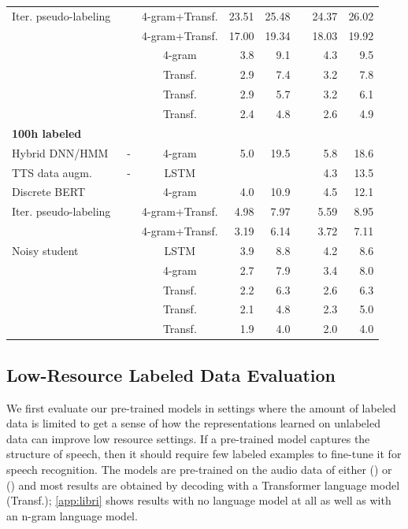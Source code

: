 \documentclass{article}
\begin{document}
\begin{table}[t]
\begin{tabular}{lccrrrrr}
Iter. pseudo-labeling~\cite{xu2020iterative} & \librisz{} & 4-gram+Transf. & 23.51 & 25.48 && 24.37 & 26.02 \\
{} & \voxsz{} & 4-gram+Transf. & 17.00 & 19.34 && 18.03 & 19.92 \\
\midrule
\wvppbase{} & \librisz{} & 4-gram & 3.8 & 9.1 && 4.3 & 9.5 \\
&& Transf. & 2.9 & 7.4 && 3.2 & 7.8 \\
\wvppbig{} & \librisz{} & Transf. & 2.9 & 5.7 && 3.2 & 6.1 \\
& \voxsz{} & Transf. & 2.4 & 4.8 && 2.6 & 4.9 \\
\midrule
\midrule
\multicolumn{8}{l}{\textbf{100h labeled}}\\
Hybrid DNN/HMM \citep{L_scher_2019} & - & 4-gram & 5.0 & 19.5 && 5.8 & 18.6 \\
TTS data augm.~\citep{aleks2020need} & - & LSTM & & && 4.3 & 13.5 \\
Discrete BERT~\citep{baevski2019effectiveness} & \librisz{} & 4-gram & 4.0 & 10.9 && 4.5 & 12.1 \\
Iter. pseudo-labeling~\cite{xu2020iterative} & \libriunsz{} & 4-gram+Transf. & 4.98 & 7.97 && 5.59 & 8.95 \\
& \voxsz{} & 4-gram+Transf. & 3.19 & 6.14 && 3.72 & 7.11 \\
Noisy student~\citep{park2020improved} & \libriunsz{} & LSTM & 3.9 & 8.8 && 4.2 & 8.6 \\
\midrule
\wvppbase{} & \librisz{} & 4-gram & 2.7 & 7.9 && 3.4 & 8.0 \\
&& Transf. & 2.2 & 6.3 && 2.6 & 6.3 \\
\wvppbig{} & \librisz{} & Transf. & 2.1 & 4.8 && 2.3 & 5.0 \\
& \voxsz{} & Transf. & 1.9 & 4.0 && 2.0 & 4.0 \\
\bottomrule
\end{tabular}
\end{table}


\subsection{Low-Resource Labeled Data Evaluation}

We first evaluate our pre-trained models in settings where the amount of labeled data is limited to get a sense of how the representations learned on unlabeled data can improve low resource settings.
If a pre-trained model captures the structure of speech, then it should require few labeled examples to fine-tune it for speech recognition.
The models are pre-trained on the audio data of either \libri{} (\librisz{}) or \vox{} (\voxsz{}) and most results are obtained by decoding with a Transformer language model (Transf.); \autoref{app:libri} shows results with no language model at all as well as with an n-gram language model.
\end{document}
